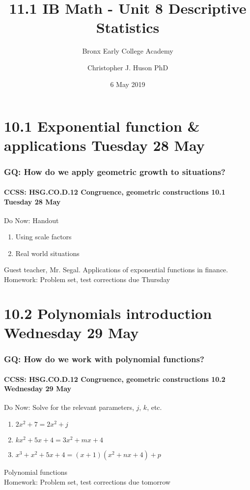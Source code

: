 \documentclass{beamer}
\title{11.1 IB Math - Unit 8 Descriptive Statistics}
\subtitle{Bronx Early College Academy}
\author{Christopher J. Huson PhD}
\date{6 May 2019}
\begin{document}
  \frame{\titlepage}
  \section[Outline]{}
  \frame{\tableofcontents}

\section{10.1 Exponential function \& applications Tuesday 28 May}
  \frame
  {
    \frametitle{GQ: How do we apply geometric growth to situations?}
    \framesubtitle{CCSS: HSG.CO.D.12 Congruence, geometric constructions \hfill \alert{10.1 Tuesday 28 May}}

    \begin{block}{Do Now: Handout}
      \begin{enumerate}
        \item Using scale factors
        \item Real world situations
      \end{enumerate}
    \end{block}
    Guest teacher, Mr. Segal. Applications of exponential functions in finance.\\[0.25cm]
    Homework: Problem set, test corrections due Thursday
  }

\section{10.2 Polynomials introduction Wednesday 29 May}
  \frame
  {
    \frametitle{GQ: How do we work with polynomial functions?}
    \framesubtitle{CCSS: HSG.CO.D.12 Congruence, geometric constructions \hfill \alert{10.2 Wednesday 29 May}}

    \begin{block}{Do Now: Solve for the relevant parameters, $j$, $k$, etc.}
      \begin{enumerate}
        \item $2x^2+7=2x^2+j$
        \item $kx^2+5x+4=3x^2+mx+4$
        \item $x^3+x^2+5x+4=(x+1)(x^2+nx+4)+p$
      \end{enumerate}
    \end{block}
    Polynomial functions\\[0.25cm]
    Homework: Problem set, test corrections due tomorrow
  }
\end{document}
